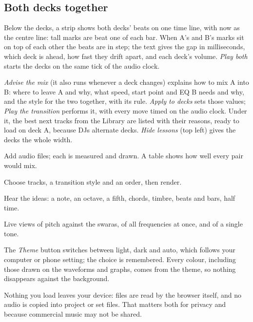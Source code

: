 \begin{description}
\section{Both decks together}
Below the decks, a strip shows both decks' beats on one time line, with now as the centre line: tall marks are beat one of each bar. When A's and B's marks sit on top of each other the beats are in step; the text gives the gap in milliseconds, which deck is ahead, how fast they drift apart, and each deck's volume. \emph{Play both} starts the decks on the same tick of the audio clock.

\emph{Advise the mix} (it also runs whenever a deck changes) explains how to mix A into B: where to leave A and why, what speed, start point and EQ B needs and why, and the style for the two together, with its rule. \emph{Apply to decks} sets those values; \emph{Play the transition} performs it, with every move timed on the audio clock. Under it, the best next tracks from the Library are listed with their reasons, ready to load on deck A, because DJs alternate decks. \emph{Hide lessons} (top left) gives the decks the whole width.
\item[Library] Add audio files; each is measured and drawn. A table shows how well every pair would mix.
\item[Set builder] Choose tracks, a transition style and an order, then render.
\item[Sound lab] Hear the ideas: a note, an octave, a fifth, chords, timbre, beats and bars, half time.
\item[Sargam, Spectrum, Tone tool] Live views of pitch against the swaras, of all frequencies at once, and of a single tone.
\end{description}

The \emph{Theme} button switches between light, dark and auto, which follows your computer or phone setting; the choice is remembered. Every colour, including those drawn on the waveforms and graphs, comes from the theme, so nothing disappears against the background.

Nothing you load leaves your device: files are read by the browser itself, and no audio is copied into project or set files. That matters both for privacy and because commercial music may not be shared.
